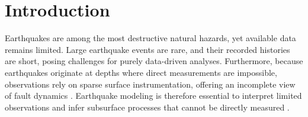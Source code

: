 \documentclass[draft]{agujournal2019}
\begin{document}
%
%

%


%
%
%
%


\section{Introduction}
\label{sec:intro}

Earthquakes are among the most destructive natural hazards, yet available data remains limited. Large earthquake events are rare, and their recorded histories are short, posing challenges for purely data-driven analyses. Furthermore, because earthquakes originate at depths where direct measurements are impossible, observations rely on sparse surface instrumentation, offering an incomplete view of fault dynamics \cite{arrowsmith2022big}. Earthquake modeling is therefore essential to interpret limited observations and infer subsurface processes that cannot be directly measured \cite{nielsen2000influence,duan2006heterogeneous,bhat2007role,ma2019dynamic,ripperger2007earthquake,gabriel2012transition,xu2015rupture}.
\end{document}
